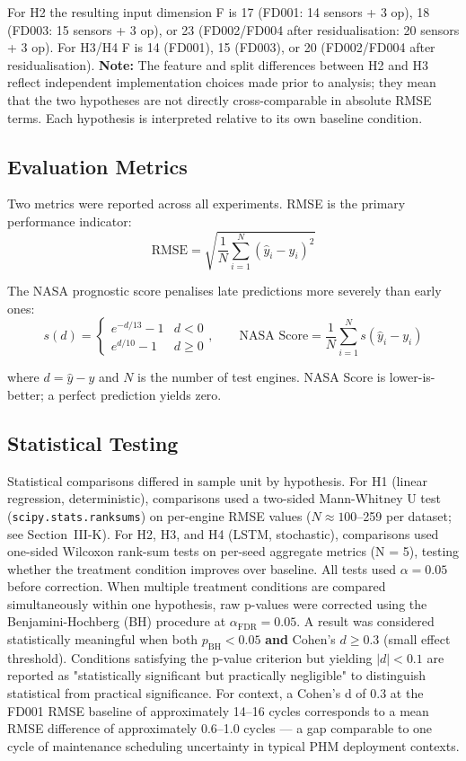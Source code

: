 \documentclass[review,12pt]{elsarticle}
\begin{document}
For H2 the resulting input dimension F is 17 (FD001: 14 sensors + 3 op), 18 (FD003: 15 sensors + 3 op), or 23 (FD002/FD004 after residualisation: 20 sensors + 3 op). For H3/H4 F is 14 (FD001), 15 (FD003), or 20 (FD002/FD004 after residualisation). \textbf{Note:} The feature and split differences between H2 and H3 reflect independent implementation choices made prior to analysis; they mean that the two hypotheses are not directly cross-comparable in absolute RMSE terms. Each hypothesis is interpreted relative to its own baseline condition.

\subsection{Evaluation Metrics}

Two metrics were reported across all experiments. RMSE is the primary performance indicator:
\begin{equation}
\text{RMSE} = \sqrt{\frac{1}{N}\sum_{i=1}^{N}(\hat{y}_i - y_i)^2}
\end{equation}

The NASA prognostic score penalises late predictions more severely than early ones:
\begin{equation}
s(d) = \begin{cases} e^{-d/13} - 1 & d < 0 \\ e^{d/10} - 1 & d \geq 0 \end{cases}, \qquad
\text{NASA Score} = \frac{1}{N}\sum_{i=1}^{N} s(\hat{y}_i - y_i)
\end{equation}

where $d = \hat{y} - y$ and $N$ is the number of test engines. NASA Score is lower-is-better; a perfect prediction yields zero.

\subsection{Statistical Testing}

Statistical comparisons differed in sample unit by hypothesis. For H1 (linear regression, deterministic), comparisons used a two-sided Mann-Whitney U test (\texttt{scipy.stats.ranksums}) on per-engine RMSE values ($N \approx 100$--259 per dataset; see Section~III-K). For H2, H3, and H4 (LSTM, stochastic), comparisons used one-sided Wilcoxon rank-sum tests on per-seed aggregate metrics (N = 5), testing whether the treatment condition improves over baseline. All tests used $\alpha = 0.05$ before correction. When multiple treatment conditions are compared simultaneously within one hypothesis, raw p-values were corrected using the Benjamini-Hochberg (BH) procedure at $\alpha_{\text{FDR}} = 0.05$. A result was considered statistically meaningful when both $p_{\text{BH}} < 0.05$ \textbf{and} Cohen's $d \geq 0.3$ (small effect threshold). Conditions satisfying the p-value criterion but yielding $|d| < 0.1$ are reported as "statistically significant but practically negligible" to distinguish statistical from practical significance. For context, a Cohen's d of 0.3 at the FD001 RMSE baseline of approximately 14–16 cycles corresponds to a mean RMSE difference of approximately 0.6–1.0 cycles — a gap comparable to one cycle of maintenance scheduling uncertainty in typical PHM deployment contexts.
\end{document}
